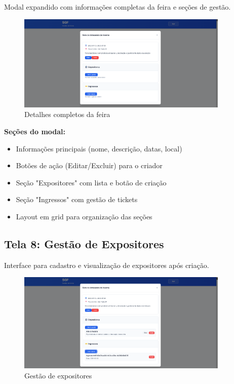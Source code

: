 \documentclass[12pt,a4paper]{article}
\begin{document}
Modal expandido com informações completas da feira e seções de gestão.

\begin{figure}[H]
\centering
\includegraphics[width=0.9\textwidth]{wireframes/07_modal_detalhes_feira.png}
\caption{Detalhes completos da feira}
\label{fig:detalhes_feira}
\end{figure}

\textbf{Seções do modal:}
\begin{itemize}
    \item Informações principais (nome, descrição, datas, local)
    \item Botões de ação (Editar/Excluir) para o criador
    \item Seção "Expositores" com lista e botão de criação
    \item Seção "Ingressos" com gestão de tickets
    \item Layout em grid para organização das seções
\end{itemize}

\subsection{Tela 8: Gestão de Expositores}

Interface para cadastro e visualização de expositores após criação.

\begin{figure}[H]
\centering
\includegraphics[width=0.9\textwidth]{wireframes/08_criar_expositor.png}
\caption{Gestão de expositores}
\label{fig:gestao_expositores}
\end{figure}
\end{document}
